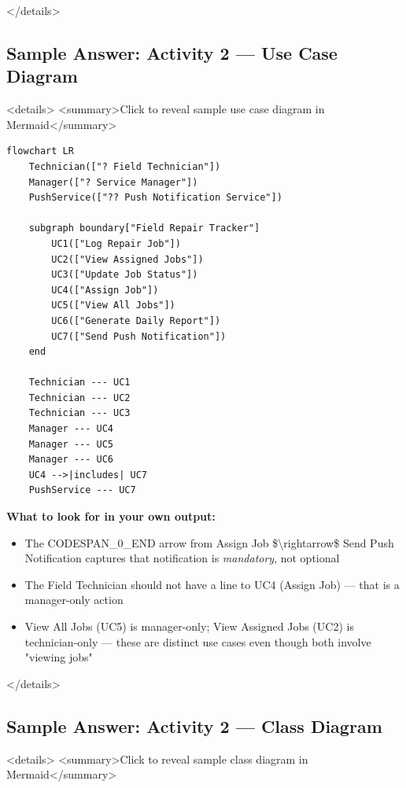 \documentclass[11pt,a4paper]{book}
\begin{document}
</details>

\medskip

\subsection{Sample Answer: Activity 2 --- Use Case Diagram}

<details>
<summary>Click to reveal sample use case diagram in Mermaid</summary>

\begin{lstlisting}
flowchart LR
    Technician(["? Field Technician"])
    Manager(["? Service Manager"])
    PushService(["?? Push Notification Service"])

    subgraph boundary["Field Repair Tracker"]
        UC1(["Log Repair Job"])
        UC2(["View Assigned Jobs"])
        UC3(["Update Job Status"])
        UC4(["Assign Job"])
        UC5(["View All Jobs"])
        UC6(["Generate Daily Report"])
        UC7(["Send Push Notification"])
    end

    Technician --- UC1
    Technician --- UC2
    Technician --- UC3
    Manager --- UC4
    Manager --- UC5
    Manager --- UC6
    UC4 -->|includes| UC7
    PushService --- UC7
\end{lstlisting}

\textbf{What to look for in your own output:}
\begin{itemize}
  \item The CODESPAN\_0\_END arrow from Assign Job \$\textbackslash{}rightarrow\$ Send Push Notification captures that notification is \textit{mandatory}, not optional
  \item The Field Technician should not have a line to UC4 (Assign Job) --- that is a manager-only action
  \item View All Jobs (UC5) is manager-only; View Assigned Jobs (UC2) is technician-only --- these are distinct use cases even though both involve "viewing jobs"
\end{itemize}

</details>

\medskip

\subsection{Sample Answer: Activity 2 --- Class Diagram}

<details>
<summary>Click to reveal sample class diagram in Mermaid</summary>
\end{document}
